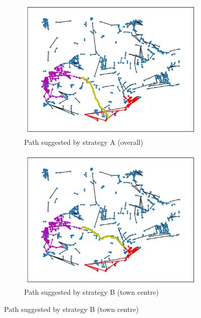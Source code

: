 \documentclass[12pt,a4paper]{report}
\begin{document}
\begin{figure}[ht]
    \centering
    \begin{subfigure}[ht]{0.6\textwidth}
        \centering
        \includegraphics[width=\textwidth,trim={1cm 1cm 1cm 1cm},clip]{diss_images/eval/overall_dundee.png}
        \caption{Path suggested by strategy A (overall)}
        \label{fig:overall dundee}
    \end{subfigure}
    \hfill
    \begin{subfigure}[ht]{0.6\textwidth}
        \centering
        \includegraphics[width=\textwidth,trim={1cm 1cm 1cm 1cm},clip]{diss_images/eval/centre_dundee.png}
        \caption{Path suggested by strategy B (town centre)}
        \label{fig:centre dundee}

\end{subfigure}
\end{figure}
\end{document}
